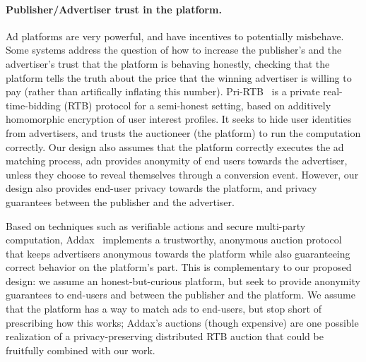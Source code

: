 \paragraph{Publisher/Advertiser trust in the platform.}
%
Ad platforms are very powerful, and have incentives to potentially misbehave.
%
Some systems address the question of how to increase the publisher's and the advertiser's trust that the platform is behaving honestly, checking \eg that the platform tells the truth about the price that the winning advertiser is willing to pay (rather than artifically inflating this number).
%
%
Pri-RTB~\cite{pri-rtb} is a private real-time-bidding (RTB) protocol for a
semi-honest setting, based on additively homomorphic encryption of user interest
profiles.
%
It seeks to hide user identities from advertisers, and trusts the
auctioneer (the platform) to run the computation correctly.
%
Our design also assumes that the platform correctly executes the ad matching process,
adn provides anonymity of end users towards the advertiser, unless they choose to
reveal themselves through a conversion event.
%
However, our design also provides end-user privacy towards the platform, and privacy
guarantees between the publisher and the advertiser.
%

%
Based on techniques such as verifiable actions and secure multi-party computation, Addax~\cite{addax} implements a trustworthy, anonymous auction protocol that keeps advertisers anonymous towards the platform while also guaranteeing correct behavior on the platform's part.
%
This is complementary to our proposed design: we assume an honest-but-curious platform, but seek to provide anonymity guarantees to end-users and between the publisher and the platform.
%
We assume that the platform has a way to match ads to end-users, but stop short of prescribing how this works; Addax's auctions (though expensive) are one possible realization of a privacy-preserving distributed RTB auction that could be fruitfully combined with our work.
%
%

%
%
